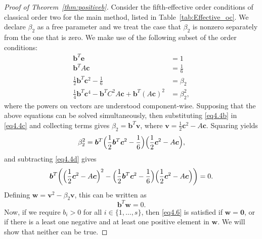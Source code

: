 
\begin{proof}[Proof of Theorem~\ref{thm:positiveb}]
    Consider the fifth-effective order conditions of classical order two for the main method, listed in Table~\ref{tab:Effective_oc}. We declare \( \beta_{2} \) as a free parameter and we treat the case that \( \beta_{2} \) is nonzero separately from the one that is zero. We make use of the following subset of the order conditions:
    \begin{subequations}\label{eq4.4}
        \begin{align}
            \bm{b}^{T}\bm{e} &= 1 \label{eq4.4a} \\
            \bm{b}^{T}A\bm{c} &= \frac{1}{6} \label{eq4.4b} \\
            \frac{1}{2}\bm{b}^{T}\bm{c}^{2} - \frac{1}{6} &= \beta_{2} \label{eq4.4c} \\
            \frac{1}{4}\bm{b}^{T}\bm{c}^{4} - \bm{b}^{T}C^{2}A\bm{c} + \bm{b}^{T}(A\bm{c})^{2} &= \beta_{2}^{2}, \label{eq4.4d}
        \end{align}
    \end{subequations}
    where the powers on vectors are understood component-wise. Supposing that the above equations can be solved simultaneously, then substituting \eqref{eq4.4b} in \eqref{eq4.4c} and collecting terms gives \( \beta_{2} = \bm{b}^{T}\bm{v} \), where \( \bm{v} = \frac{1}{2}\bm{c}^{2} - A\bm{c} \). Squaring yields
    \begin{equation*}%
        \beta_{2}^{2} = \bm{b}^{T}\Bigl(\frac{1}{2}\bm{b}^{T}\bm{c}^{2} - \frac{1}{6}\Bigr)\Bigl(\frac{1}{2}\bm{c}^{2} - A\bm{c}\Bigr),
    \end{equation*}
    and subtracting \eqref{eq4.4d} gives
    \begin{equation*}
        \bm{b}^{T}\biggl(\Bigl(\frac{1}{2}\bm{c}^{2} - A\bm{c}\Bigr)^{2} - \Bigl(\frac{1}{2}\bm{b}^{T}\bm{c}^{2} - \frac{1}{6}\Bigr)\Bigl(\frac{1}{2}\bm{c}^{2} - A\bm{c}\Bigr)\biggr) = 0.
    \end{equation*}
    Defining \( \bm{w} = \bm{v}^{2} - \beta_{2}\bm{v} \), this can be written as
    \begin{equation}\label{eq4.6}
        \bm{b}^{T}\bm{w} = 0.
    \end{equation}
    Now, if we require \( b_{i} > 0 \) for all \( i \in \{1,\dots, s\} \), then \eqref{eq4.6} is satisfied if \( \bm{w} = \bm{0} \),
or if there is a least one negative and at least one positive element in \( \bm{w} \).
We will show that neither can be true.



\end{proof}
